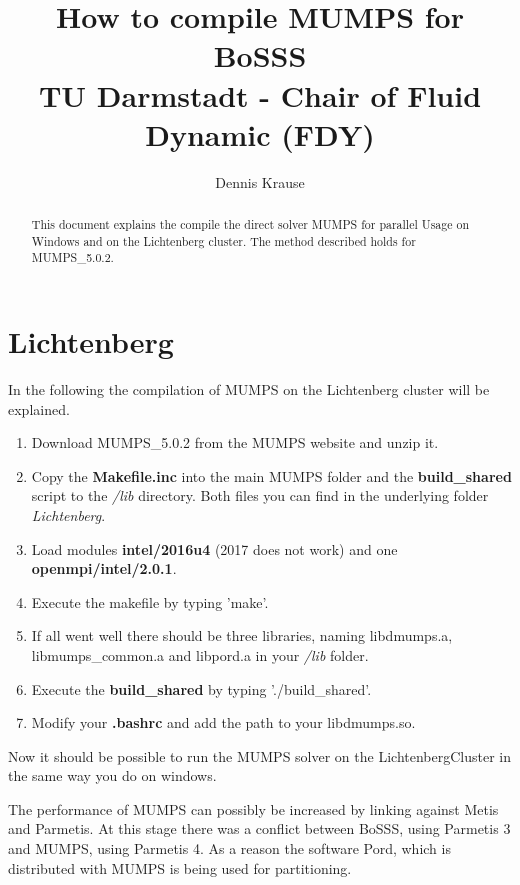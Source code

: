 \documentclass[11pt,twoside,a4paper]{fdyartcl}
\title{How to compile MUMPS for BoSSS\\TU Darmstadt - Chair of Fluid Dynamic (FDY)}
\author{Dennis Krause}
\theoremstyle{myPlain}
\theoremstyle{myDefinition}
\begin{document}


\maketitle


\begin{abstract}
This document explains the compile the direct solver MUMPS for parallel Usage on Windows and on the Lichtenberg cluster. The method described holds for MUMPS\_5.0.2.
\end{abstract}

\section{Lichtenberg}
In the following the compilation of MUMPS on the Lichtenberg cluster will be explained.
\begin{enumerate}
	\item Download MUMPS\_5.0.2 from the MUMPS website and unzip it.
	\item Copy the \textbf{Makefile.inc} into the main MUMPS folder and the \textbf{build\_shared} script to the \textit{/lib} directory. Both files you can find in the underlying folder \textit{Lichtenberg}.
	\item Load modules \textbf{intel/2016u4} (2017 does not work) and one \textbf{openmpi/intel/2.0.1}.
	\item Execute the makefile by typing 'make'.
	\item If all went well there should be three libraries, naming libdmumps.a, libmumps\_common.a and libpord.a in your \textit{/lib} folder.
	\item Execute the \textbf{build\_shared} by typing './build\_shared'.
	\item Modify your \textbf{.bashrc} and add the path to your libdmumps.so.	
\end{enumerate}
Now it should be possible to run the MUMPS solver on the LichtenbergCluster in the same way you do on windows. 

The performance of MUMPS can possibly be increased by linking against Metis and Parmetis. At this stage there was a conflict between BoSSS, using Parmetis 3 and MUMPS, using Parmetis 4. As a reason the software Pord, which is distributed with MUMPS is being used for partitioning.
\end{document}
